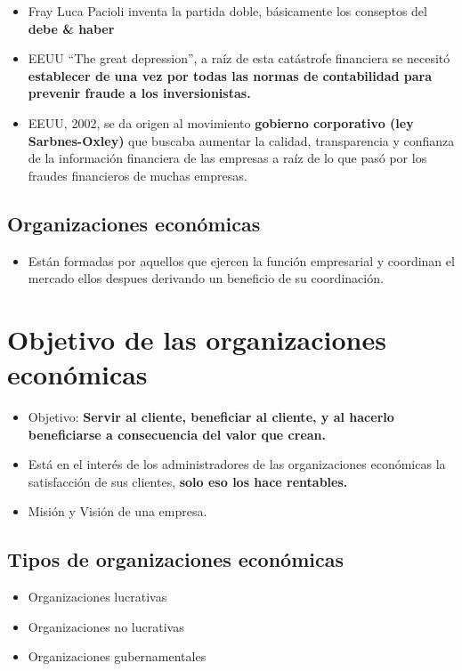 \documentclass{article}
\begin{document}
\begin{itemize}
    
    \item Fray Luca Pacioli inventa la partida doble, básicamente los conseptos del \textbf{debe \& haber}

    
    \item EEUU ``The great depression'', a raíz de esta catástrofe financiera se necesitó \textbf{establecer de una vez por todas las normas de contabilidad para prevenir fraude a los inversionistas.}

    
    \item EEUU, 2002, se da origen al movimiento \textbf{gobierno corporativo (ley Sarbnes-Oxley)} que buscaba aumentar la calidad, transparencia y confianza de la información financiera de las empresas a raíz de lo que pasó por los fraudes financieros de muchas empresas. 
\end{itemize}

\subsection{Organizaciones económicas}
\begin{itemize}
    \item Están formadas por aquellos que ejercen la función empresarial y coordinan el mercado ellos despues derivando un beneficio de su coordinación.
\end{itemize}

\section{Objetivo de las organizaciones económicas}
\begin{itemize}
    \item Objetivo: \textbf{Servir al cliente, beneficiar al cliente, y al hacerlo beneficiarse a consecuencia del valor que crean.}
    \item Está en el interés de los administradores de las organizaciones económicas la satisfacción de sus clientes, \textbf{solo eso los hace rentables.}
    \item Misión y Visión de una empresa.
\end{itemize}

\subsection{Tipos de organizaciones económicas}
\begin{itemize}
    \small
    \item Organizaciones lucrativas
    \item Organizaciones no lucrativas
    \item Organizaciones gubernamentales
\end{itemize}
\end{document}
